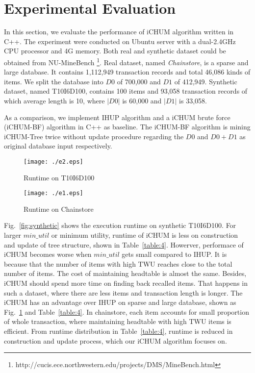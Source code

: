 \documentclass[runningheads,a4paper]{llncs}
\begin{document}
\section{Experimental Evaluation}
In this section, we evaluate the performance of iCHUM algorithm written in C++. The experiment were conducted on Ubuntu server with a dual-2.4GHz CPU processor and 4G memory. Both real and synthetic dataset could be obtained from NU-MineBench \footnote{http://cucis.ece.northwestern.edu/projects/DMS/MineBench.html}. Real dataset, named \textit{Chainstore}, is a sparse and large database. It contains 1,112,949 transaction records and total 46,086 kinds of items. We split the database into $ D0 $ of 700,000 and $ D1 $ of 412,949. Synthetic dataset, named T10I6D100, contains 100 items and 93,058 transaction records of which average length is 10, where $ |D0| $ is 60,000 and $ |D1| $ is 33,058.

As a comparison, we implement IHUP algorithm and a iCHUM brute force (iCHUM-BF) algorithm in C++ as baseline. The iCHUM-BF algorithm is mining iCHUM-Tree twice without update procedure regarding the $ D0 $ and $ D0+D1 $ as original database input respectively.

\begin{figure}
\centering
\begin{minipage}[b]{0.48\textwidth}
\centering
\texttt{[image: ./e2.eps]}
\caption{Runtime on T10I6D100}
\label{fig:synthetic}
\end{minipage}
\begin{minipage}[b]{0.48\textwidth}
\centering
\texttt{[image: ./e1.eps]}
\caption{Runtime on Chainstore}
\label{fig:real}
\end{minipage}
\end{figure}

Fig.~\ref{fig:synthetic} shows the execution runtime on synthetic T10I6D100. For larger $ min\_util $ or minimum utility, runtime of iCHUM is less on construction and update of tree structure, shown in Table~\ref{table:4}. Howerver, performace of iCHUM becomes worse when $ min\_util $ gets small compared to IHUP. It is because that the number of items with high TWU reaches close to the total number of items. The cost of maintaining headtable is almost the same. Besides, iCHUM should spend more time on finding back recalled items. That happens in such a dataset, where there are less items and transaction length is longer. The iCHUM has an advantage over IHUP on sparse and large database, shown as Fig.~\ref{fig:real} and Table~\ref{table:4}. In chainstore, each item accounts for small proportion of whole transaction, where maintaining headtable with high TWU items is efficient. From runtime distribution in Table~\ref{table:4}, runtime is reduced in construction and update process, which our iCHUM algorithm focuses on.
\end{document}
